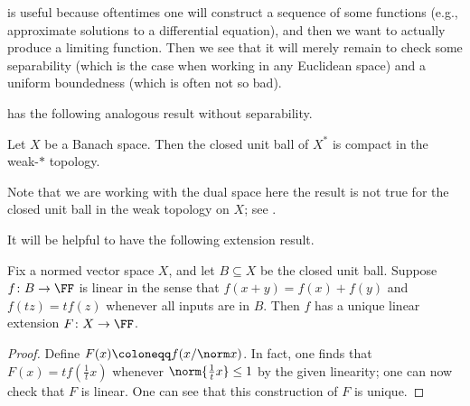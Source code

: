 \documentclass[../notes.tex]{subfiles}
\begin{document}
\begin{remark}
	 is useful because oftentimes one will construct a sequence of some functions (e.g., approximate solutions to a differential equation), and then we want to actually produce a limiting function. Then we see that it will merely remain to check some separability (which is the case when working in any Euclidean space) and a uniform boundedness (which is often not so bad).
\end{remark}
 has the following analogous result without separability.
\begin{theorem}[Alaoglu]
	Let $X$ be a Banach space. Then the closed unit ball of $X^*$ is compact in the weak-$*$ topology.
\end{theorem}
Note that we are working with the dual space here the result is not true for the closed unit ball in the weak topology on $X$; see .

It will be helpful to have the following extension result.
\begin{lemma}
	Fix a normed vector space $X$, and let $B\subseteq X$ be the closed unit ball. Suppose $f\colon B\to\FF$ is linear in the sense that $f(x+y)=f(x)+f(y)$ and $f(tz)=tf(z)$ whenever all inputs are in $B$. Then $f$ has a unique linear extension $F\colon X\to\FF$.
\end{lemma}
\begin{proof}
	Define $F(x)\coloneqq f(x/\norm x)$. In fact, one finds that $F(x)=tf\left(\frac1tx\right)$ whenever $\norm{\frac1tx}\le1$ by the given linearity; one can now check that $F$ is linear. One can see that this construction of $F$ is unique.
\end{proof}
\end{document}
